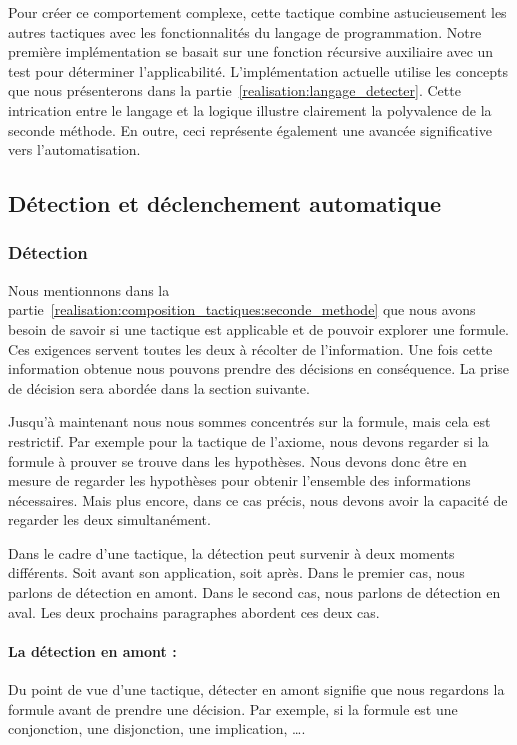 \documentclass[french,titlepage]{article}
\begin{document}
Pour créer ce comportement complexe, cette tactique combine astucieusement les autres tactiques avec les fonctionnalités du langage de programmation. Notre première implémentation se basait sur une fonction récursive auxiliaire avec un test pour déterminer l'applicabilité. L'implémentation actuelle utilise les concepts que nous présenterons dans la partie~\ref{realisation:langage_detecter}. Cette intrication entre le langage et la logique illustre clairement la polyvalence de la seconde méthode. En outre, ceci représente également une avancée significative vers l'automatisation.

\subsection{Détection et déclenchement automatique} \label{realisation:detection_declenchement}
\subsubsection{Détection} \label{realisation:detection_declenchement:detection}
Nous mentionnons dans la partie~\ref{realisation:composition_tactiques:seconde_methode} que nous avons besoin de savoir si une tactique est applicable et de pouvoir explorer une formule. Ces exigences servent toutes les deux à récolter de l'information. Une fois cette information obtenue nous pouvons prendre des décisions en conséquence. La prise de décision sera abordée dans la section suivante.

Jusqu'à maintenant nous nous sommes concentrés sur la formule, mais cela est restrictif. Par exemple pour la tactique de l'axiome, nous devons regarder si la formule à prouver se trouve dans les hypothèses. Nous devons donc être en mesure de regarder les hypothèses pour obtenir l'ensemble des informations nécessaires. Mais plus encore, dans ce cas précis, nous devons avoir la capacité de regarder les deux simultanément.

Dans le cadre d'une tactique, la détection peut survenir à deux moments différents. Soit avant son application, soit après. Dans le premier cas, nous parlons de détection en amont. Dans le second cas, nous parlons de détection en aval. Les deux prochains paragraphes abordent ces deux cas.

\paragraph{La détection en amont :} \label{realisation:detection_declenchement:detection:amont}
Du point de vue d'une tactique, détecter en amont signifie que nous regardons la formule avant de prendre une décision. Par exemple, si la formule est une conjonction, une disjonction, une implication, \dots.
\end{document}
